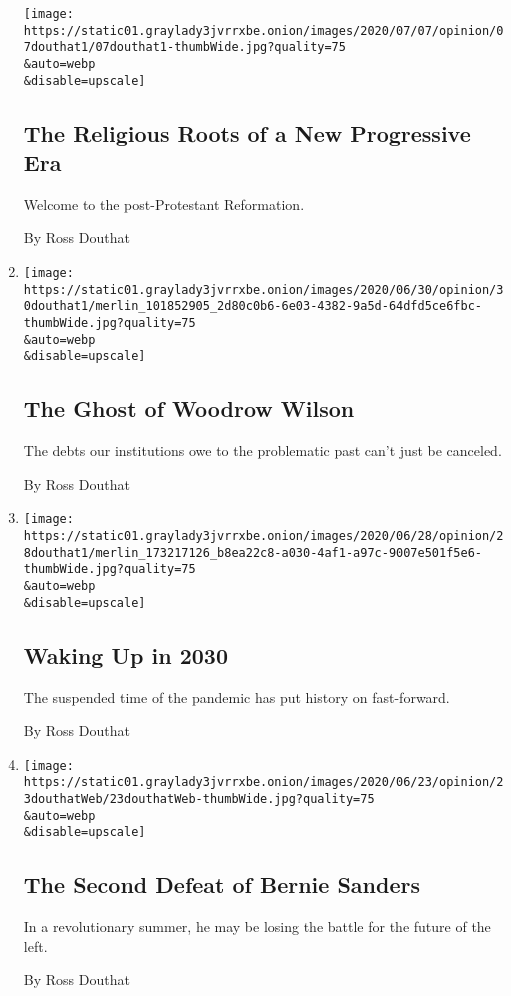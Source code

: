 \begin{enumerate}
  \texttt{[image: https://static01.graylady3jvrrxbe.onion/images/2020/07/07/opinion/07douthat1/07douthat1-thumbWide.jpg?quality=75\\\&auto=webp\\\&disable=upscale]}

  \hypertarget{the-religious-roots-of-a-new-progressive-era}{%
  \subsection{The Religious Roots of a New Progressive
  Era}\label{the-religious-roots-of-a-new-progressive-era}}

  Welcome to the post-Protestant Reformation.

  By Ross Douthat
\item
  \href{/2020/06/30/opinion/woodrow-wilson-princeton.html}{}

  \texttt{[image: https://static01.graylady3jvrrxbe.onion/images/2020/06/30/opinion/30douthat1/merlin\_101852905\_2d80c0b6-6e03-4382-9a5d-64dfd5ce6fbc-thumbWide.jpg?quality=75\\\&auto=webp\\\&disable=upscale]}

  \hypertarget{the-ghost-of-woodrow-wilson}{%
  \subsection{The Ghost of Woodrow
  Wilson}\label{the-ghost-of-woodrow-wilson}}

  The debts our institutions owe to the problematic past can't just be
  canceled.

  By Ross Douthat
\item
  \href{/2020/06/27/opinion/sunday/us-coronavirus-2030.html}{}

  \texttt{[image: https://static01.graylady3jvrrxbe.onion/images/2020/06/28/opinion/28douthat1/merlin\_173217126\_b8ea22c8-a030-4af1-a97c-9007e501f5e6-thumbWide.jpg?quality=75\\\&auto=webp\\\&disable=upscale]}

  \hypertarget{waking-up-in-2030}{%
  \subsection{Waking Up in 2030}\label{waking-up-in-2030}}

  The suspended time of the pandemic has put history on fast-forward.

  By Ross Douthat
\item
  \href{/2020/06/23/opinion/bernie-sanders-protesters-democrats.html}{}

  \texttt{[image: https://static01.graylady3jvrrxbe.onion/images/2020/06/23/opinion/23douthatWeb/23douthatWeb-thumbWide.jpg?quality=75\\\&auto=webp\\\&disable=upscale]}

  \hypertarget{the-second-defeat-of-bernie-sanders}{%
  \subsection{The Second Defeat of Bernie
  Sanders}\label{the-second-defeat-of-bernie-sanders}}

  In a revolutionary summer, he may be losing the battle for the future
  of the left.

  By Ross Douthat
\end{enumerate}

